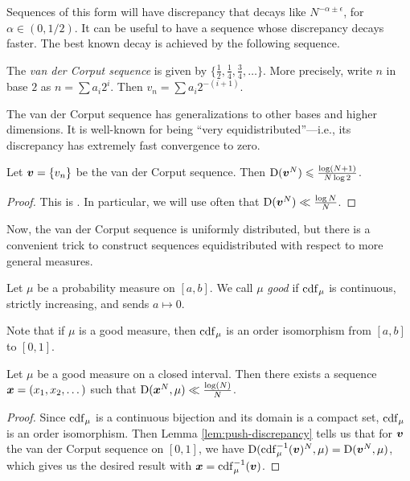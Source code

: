 Sequences of this form will have discrepancy that decays like 
$N^{-\alpha\pm \epsilon}$, for $\alpha\in (0,1/2)$. It can be useful to have a 
sequence whose discrepancy decays faster. The best known decay is achieved by 
the following sequence. 

\begin{definition}
The \emph{van der Corput sequence} is given by 
$\{\frac 1 2,\frac 1 4,\frac 3 4,\dots\}$. More precisely, write $n$ in base 
$2$ as $n = \sum a_i 2^i$. Then $v_n = \sum a_i 2^{-(i+1)}$. 
\end{definition}

The van der Corput sequence has generalizations to other bases and higher 
dimensions. It is well-known for being ``very equidistributed''---i.e., its 
discrepancy has extremely fast convergence to zero. 

\begin{lemma}
Let ${\boldsymbol v}=\{v_n\}$ be the van der Corput sequence. Then
$\operatorname{D}({\boldsymbol v}^N) \leqslant \frac{\log(N+1)}{N\log 2}$. 
\end{lemma}
\begin{proof}
This is \cite[Ch.~2 Th.~3.5]{kuipers-niederreiter-1974}. In particular, we 
will use often that $\operatorname{D}({\boldsymbol v}^N)\ll \frac{\log N}{N}$. 
\end{proof}

Now, the van der Corput sequence is uniformly distributed, but there is a 
convenient trick to construct sequences equidistributed with respect to more 
general measures. 

\begin{definition}
Let $\mu$ be a probability measure on $[a,b]$. We call $\mu$ \emph{good} if 
$\operatorname{cdf}_\mu$ is continuous, strictly increasing, and sends $a\mapsto 0$. 
\end{definition}

Note that if $\mu$ is a good measure, then $\operatorname{cdf}_\mu$ is an order isomorphism 
from $[a,b]$ to $[0,1]$. 

\begin{theorem}\label{thm:van-der-corput}
Let $\mu$ be a good measure on a closed interval. Then there exists a sequence 
${\boldsymbol x}=(x_1,x_2,\dots)$ such that $\operatorname{D}({\boldsymbol x}^N,\mu) \ll \frac{\log(N)}{N}$. 
\end{theorem}
\begin{proof}
Since $\operatorname{cdf}_\mu$ is a continuous bijection and its domain is a compact set, 
$\operatorname{cdf}_\mu$ is an order isomorphism. Then Lemma \ref{lem:push-discrepancy} tells 
us that for ${\boldsymbol v}$ the van der Corput sequence on $[0,1]$, we have 
$\operatorname{D}(\operatorname{cdf}_\mu^{-1}({\boldsymbol v})^N, \mu) = \operatorname{D}({\boldsymbol v}^N,\mu)$, which gives us the 
desired result with ${\boldsymbol x} = \operatorname{cdf}_\mu^{-1}({\boldsymbol v})$. 
\end{proof}

